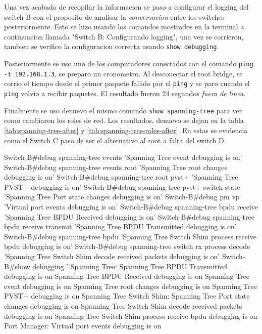 Una vez acabado de recopilar la informacion se paso a configurar el logging del switch
B con el proposito de analisar la \textit{conversacion} entre los switches
posteriormente. Esto se hizo usando los comandos mostrados en la terminal a
continuacion llamada "Switch B: Configurando logging", una vez se corrieron, tambien se
verifico la configuracion correcta usando \texttt{show debugging}.

Posteriormente se uso uno de los computadores conectados con el comando \texttt{ping -t
192.168.1.3}, se preparo un cronometro. Al desconectar el root bridge, se corrio el
tiempo desde el primer paquete fallido por el \texttt{ping} y se paro cuando el
\texttt{ping} volvio a recibir paquetes. El resultado fueron 24 segundos \textit{fuera
de linea}.

Finalmente se uso denuevo el mismo comando \texttt{show spanning-tree} para ver como
cambiaron los roles de red. Los resultados, denuevo se dejan en la tabla
\ref{tab:spanning-tree-after} y \ref{tab:spanning-tree-roles-after}. En estas se
evidencia como el Switch C paso de ser el alternativo al root a falta del switch D.


\begin{darkcode}
Switch-B#debug spanning-tree events
'Spanning Tree event debugging is on'
Switch-B#debug spanning-tree events root
'Spanning Tree root changes debugging is on'
Switch-B#debug spanning-tree root pvst+
'Spanning Tree PVST+ debugging is on'
Switch-B#debug spanning-tree pvst+ switch state
'Spanning Tree Port state changes debugging is on'
Switch-B#debug pm vp
'Virtual port events debugging is on'
Switch-B#debug spanning-tree bpdu receive
'Spanning Tree BPDU Received debugging is on'
Switch-B#debug spanning-tree bpdu receive transmit
'Spanning Tree BPDU Transmitted debugging is on'
Switch-B#debug spanning-tree bpdu
'Spanning Tree Switch Shim process receive bpdu debugging is on'
Switch-B#debug spanning-tree switch rx process decode
'Spanning Tree Switch Shim decode received packets debugging is on'
Switch-B#show debugging
'
Spanning Tree:
  Spanning Tree BPDU Transmitted debugging is on
  Spanning Tree BPDU Received debugging is on
  Spanning Tree event debugging is on
  Spanning Tree root changes debugging is on
  Spanning Tree PVST+ debugging is on
Spanning Tree Switch Shim:
  Spanning Tree Port state changes debugging is on
  Spanning Tree Switch Shim decode received packets debugging is on
  Spanning Tree Switch Shim process receive bpdu debugging is on
Port Manager:
  Virtual port events debugging is on
\end{darkcode}

